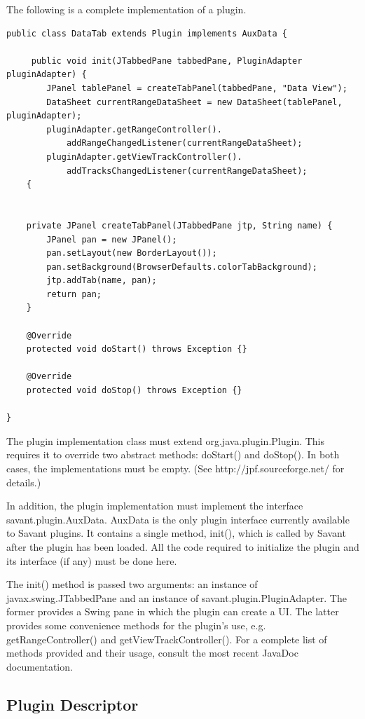 \documentclass{report}
\begin{document}
The following is a complete implementation of a plugin.

\begin{verbatim}
public class DataTab extends Plugin implements AuxData {

     public void init(JTabbedPane tabbedPane, PluginAdapter pluginAdapter) {
        JPanel tablePanel = createTabPanel(tabbedPane, "Data View");
        DataSheet currentRangeDataSheet = new DataSheet(tablePanel, pluginAdapter);
        pluginAdapter.getRangeController().
            addRangeChangedListener(currentRangeDataSheet);
        pluginAdapter.getViewTrackController().
            addTracksChangedListener(currentRangeDataSheet);
    {
    

    private JPanel createTabPanel(JTabbedPane jtp, String name) {
        JPanel pan = new JPanel();
        pan.setLayout(new BorderLayout());
        pan.setBackground(BrowserDefaults.colorTabBackground);
        jtp.addTab(name, pan);
        return pan;
    }

    @Override
    protected void doStart() throws Exception {}

    @Override
    protected void doStop() throws Exception {}

}
\end{verbatim}    

The plugin implementation class must extend org.java.plugin.Plugin. This requires it to override two abstract methods: doStart() and doStop(). In both cases, the implementations must be empty. (See http://jpf.sourceforge.net/ for details.)

In addition, the plugin implementation must implement the interface savant.plugin.AuxData. AuxData is the only plugin interface currently available to Savant plugins. It contains a single method, init(), which is called by Savant after the plugin has been loaded. All the code required to initialize the plugin and its interface (if any) must be done here. 

The init() method is passed two arguments: an instance of javax.swing.JTabbedPane and an instance of savant.plugin.PluginAdapter. The former provides a Swing pane in which the plugin can create a UI. The latter provides some convenience methods for the plugin's use, e.g. getRangeController() and getViewTrackController(). For a complete list of methods provided and their usage, consult the most recent JavaDoc documentation.

\subsection{Plugin Descriptor}
\end{document}
